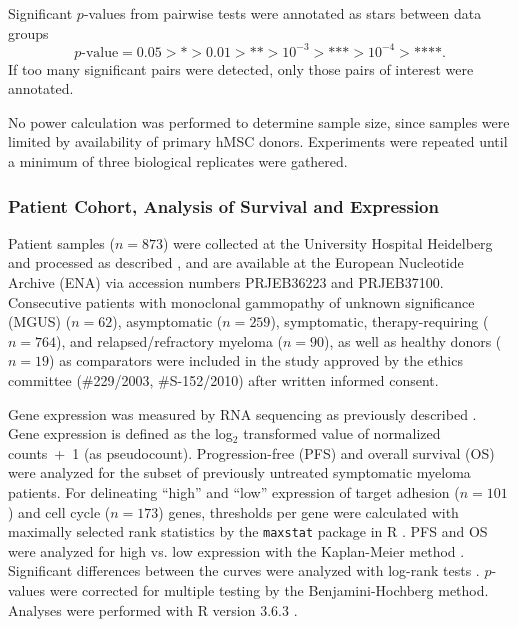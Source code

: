 Significant \(p\)-values from pairwise tests were annotated as stars between
data groups
\[ p\text{-value} = 0.05 > \text{*} > 0.01 > \text{**} > 10^{-3} >
    \text{***}> 10^{-4} > \text{****}. \]
If too many significant pairs were
detected, only those pairs of interest were annotated.

No power calculation was performed to determine sample size, since samples were
limited by availability of primary hMSC donors. Experiments were repeated until
a minimum of three biological replicates were gathered.


\subsubsection*{Patient Cohort, Analysis of Survival and Expression}
Patient samples (\(n=873\)) were collected at the University Hospital Heidelberg
and processed as described \cite{seckingerTargetExpressionGeneration2017b,
    seckingerCD38ImmunotherapeuticTarget2018}, and are available at the European
Nucleotide Archive (ENA) via accession numbers PRJEB36223 and PRJEB37100.
Consecutive patients with monoclonal gammopathy of unknown significance (MGUS)
(\(n = 62\)), asymptomatic (\(n = 259\)), symptomatic, therapy-requiring (\(n =
764\)), and relapsed/refractory myeloma (\(n = 90\)), as well as healthy donors
(\(n = 19\)) as comparators were included in the study approved by the ethics
committee (\#229/2003, \#S-152/2010) after written informed consent.

Gene expression was measured by RNA sequencing as previously described
\cite{seckingerCD38ImmunotherapeuticTarget2018}. Gene expression is defined as
the log\(_2\) transformed value of normalized counts~+~1 (as pseudocount).
Progression-free (PFS) and overall survival (OS) were analyzed for the subset of
previously untreated symptomatic myeloma patients. For delineating “high” and
“low” expression of target adhesion (\(n=101\)) and cell cycle (\(n=173\))
genes, thresholds per gene were calculated with maximally selected rank
statistics by the \texttt{maxstat} package in R
\cite{hothornMaximallySelectedRank2017}. PFS and OS were analyzed for high
vs. low expression with the Kaplan-Meier method \cite{kaplanNonparametricEstimationIncomplete1958}.
Significant differences between the curves were analyzed with log-rank tests
\cite{harringtonClassRankTest1982}. \(p\)-values were corrected for multiple testing
by the Benjamini-Hochberg method. Analyses were performed with R version 3.6.3
\cite{rcoreteamLanguageEnvironmentStatistical2018}.


